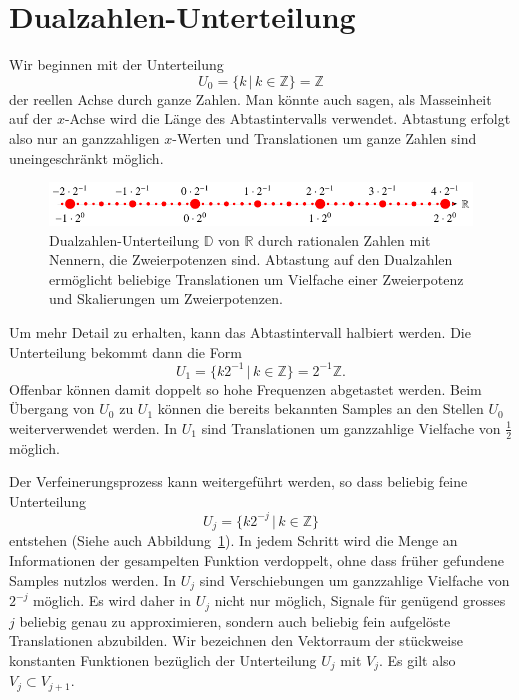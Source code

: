 %
%
%
\section{Dualzahlen-Unterteilung%
\label{section:dualzahlen}}
Wir beginnen mit der Unterteilung
\[
U_0
=
\{ k\,|\, k\in\mathbb Z\}
=
\mathbb Z
\]
der reellen Achse durch ganze Zahlen.
Man könnte auch sagen, als Masseinheit auf der $x$-Achse wird die
Länge des Abtastintervalls verwendet.
Abtastung erfolgt also nur an ganzzahligen $x$-Werten und
Translationen um ganze Zahlen sind uneingeschränkt möglich.

\begin{figure}
\centering
\includegraphics{chapters/3-haar/images/dual.pdf}
\caption{Dualzahlen-Unterteilung $\mathbb D$ von $\mathbb R$ durch
rationalen Zahlen mit Nennern, die Zweierpotenzen sind. 
Abtastung auf den Dualzahlen ermöglicht beliebige Translationen um
Vielfache einer Zweierpotenz und Skalierungen um Zweierpotenzen.
\label{haar:figure:dualzahlen}}
\end{figure}
Um mehr Detail zu erhalten, kann das Abtastintervall halbiert werden.
Die Unterteilung bekommt dann die Form
\[
U_1
=
\{ k2^{-1}\,|\, k\in\mathbb Z\}
=
2^{-1}\mathbb Z.
\]
Offenbar können damit doppelt so hohe Frequenzen abgetastet werden.
Beim Übergang von $U_0$ zu $U_1$ können die bereits bekannten Samples
an den Stellen $U_0$ weiterverwendet werden.
In $U_1$ sind Translationen um ganzzahlige Vielfache von $\frac12$ 
möglich.

Der Verfeinerungsprozess kann weitergeführt werden, so dass beliebig
feine Unterteilung
\[
U_j = \{ k2^{-j}\,|\,k\in\mathbb Z\}
\]
entstehen (Siehe auch Abbildung~\ref{haar:figure:dualzahlen}).
In jedem Schritt wird die Menge an Informationen der gesampelten Funktion
verdoppelt, ohne dass früher gefundene Samples nutzlos werden.
In $U_j$ sind Verschiebungen um ganzzahlige Vielfache von $2^{-j}$ 
möglich.
Es wird daher in $U_j$ nicht nur möglich, Signale für genügend grosses $j$
beliebig genau zu approximieren, sondern auch beliebig fein aufgelöste
Translationen abzubilden.
Wir bezeichnen den Vektorraum der stückweise konstanten Funktionen
bezüglich der Unterteilung $U_j$ mit $V_j$.
Es gilt also $V_j \subset V_{j+1}$.

